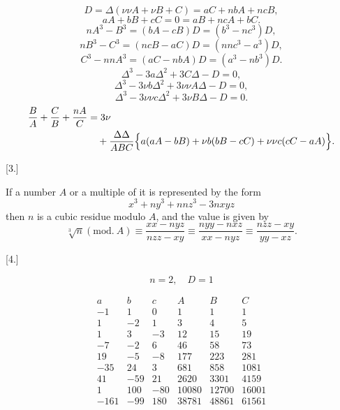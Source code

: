 \[
D = \Delta(\nu\nu A+\nu B+C) = aC+nbA+ncB,
\]
\[
aA+bB+cC = 0 = aB+ncA+bC.
\]
\[
nA^3-B^3 = (bA-cB)D = (b^3-nc^3)D,
\]
\[
nB^3-C^3 = (ncB-aC)D = (nnc^3-a^3)D,
\]
\[
C^3-nnA^3 = (aC-nbA)D = (a^3-nb^3)D.
\]
\[
\Delta^3-3a\Delta^2+3C\Delta-D = 0,
\]
\[
\Delta^3-3\nu b\Delta^2+3\nu\nu A\Delta-D = 0,
\]
\[
\Delta^3-3\nu\nu c\Delta^2+3\nu B\Delta-D = 0.
\]
\[
\begin{aligned}\frac{B}{A} + \frac{C}{B} + \frac{nA}{C} &= 3\nu\\ &\quad + \frac{\Delta\Delta}{ABC}
\Bigl\{a(aA-bB)+\nu b(bB-cC)+\nu\nu c(cC-aA)\Bigr\}.\end{aligned}
\]

\begin{center}[3.]\end{center}\par\noindent\hspace*{\parindent}If a number $A$ or a multiple of it is represented by the form
\[
x^3+ny^3+nnz^3-3nxyz
\]
\noindent then $n$ is a cubic residue modulo $A$, and the value is given by
\[
\sqrt[3]{n} (\mathrm{mod.}\ A) \equiv \frac{xx-nyz}{nzz-xy} \equiv \frac{nyy-nxz}{xx-nyz} \equiv
\frac{nzz-xy}{yy-xz}.
\]

\begin{center}[4.]\end{center}

\[n=2,\quad D=1\]

\[
\begin{array}{ccc|ccc}
a & b & c & A & B & C \\
-1 & 1 & 0 & 1 & 1 & 1 \\
1 & -2 & 1 & 3 & 4 & 5 \\
1 & 3 & -3 & 12 & 15 & 19 \\
-7 & -2 & 6 & 46 & 58 & 73 \\
19 & -5 & -8 & 177 & 223 & 281 \\
-35 & 24 & 3 & 681 & 858 & 1081 \\
41 & -59 & 21 & 2620 & 3301 & 4159 \\
1 & 100 & -80 & 10080 & 12700 & 16001 \\
-161 & -99 & 180 & 38781 & 48861 & 61561 \\
\end{array}
\]

